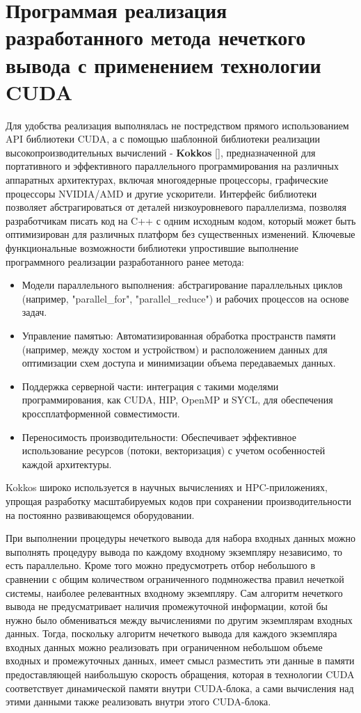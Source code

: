 \chapter{Программая реализация разработанного метода нечеткого вывода с применением технологии CUDA}\label{ch:ch3}

Для удобства реализация выполнялась не постредством прямого использованием API библиотеки CUDA, а с помощью шаблонной библиотеки реализации высокопроизводительных вычислений - \textbf{Kokkos} \ref{}, предназначенной для портативного и эффективного параллельного программирования на различных аппаратных архитектурах, включая многоядерные процессоры, графические процессоры NVIDIA/AMD и другие ускорители. Интерфейс библиотеки позволяет абстрагироваться от деталей низкоуровневого параллелизма, позволяя разработчикам писать код на C++ с одним исходным кодом, который может быть оптимизирован для различных платформ без существенных изменений. 
Ключевые функциональные возможности библиотеки упростившие выполнение программного реализации разработанного ранее метода:
\begin{itemize}
\item Модели параллельного выполнения: абстрагирование параллельных циклов (например, "parallel\_for", "parallel\_reduce") и рабочих процессов на основе задач.  
\item Управление памятью: Автоматизированная обработка пространств памяти (например, между хостом и устройством) и расположением данных для оптимизации схем доступа и минимизации объема передаваемых данных.  
\item Поддержка серверной части: интеграция с такими моделями программирования, как CUDA, HIP, OpenMP и SYCL, для обеспечения кроссплатформенной совместимости.  
\item Переносимость производительности: Обеспечивает эффективное использование ресурсов (потоки, векторизация) с учетом особенностей каждой архитектуры.
\end{itemize}

Kokkos широко используется в научных вычислениях и HPC-приложениях, упрощая разработку масштабируемых кодов при сохранении производительности на постоянно развивающемся оборудовании. 

При выполнении процедуры нечеткого вывода для набора входных данных можно выполнять процедуру вывода по каждому входному экземпляру независимо, то есть параллельно. Кроме того можно предусмотреть отбор небольшого в сравнении с общим количеством ограниченного подмножества правил нечеткой системы, наиболее релевантных входному экземпляру. Сам алгоритм нечеткого вывода не предусматривает наличия промежуточной информации, котой бы нужно было обмениваться между вычислениями по другим экземплярам входных данных. Тогда, поскольку алгоритм нечеткого вывода для каждого экземпляра входных данных можно реализовать при ограниченном небольшом объеме входных и промежуточных данных, имеет смысл разместить эти данные в памяти предоставляющей наибольшую скорость обращения, которая в технологии CUDA соответствует динамической памяти внутри CUDA-блока, а сами вычисления над этими данными также реализовать внутри этого CUDA-блока.



